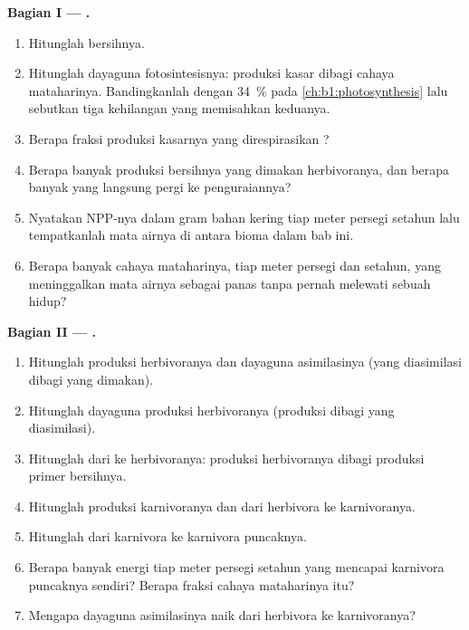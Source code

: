 \begin{problem}
\medskip
\noindent\textbf{Bagian I --- .}
\begin{enumerate}
  \item Hitunglah  bersihnya.
  \item Hitunglah dayaguna fotosintesisnya: produksi kasar dibagi
        cahaya mataharinya. Bandingkanlah dengan \qty{34}{\%} pada
        \cref{ch:b1:photosynthesis} lalu sebutkan tiga kehilangan yang
        memisahkan keduanya.
  \item Berapa fraksi produksi kasarnya yang direspirasikan
        ?
  \item Berapa banyak produksi bersihnya yang dimakan herbivoranya, dan
        berapa banyak yang langsung pergi ke penguraiannya?
  \item Nyatakan NPP-nya dalam gram bahan kering tiap meter persegi
        setahun lalu tempatkanlah mata airnya di antara bioma dalam bab
        ini.
  \item Berapa banyak cahaya mataharinya, tiap meter persegi dan
        setahun, yang meninggalkan mata airnya sebagai panas tanpa
        pernah melewati sebuah  hidup?
\end{enumerate}

\medskip
\noindent\textbf{Bagian II --- .}
\begin{enumerate}[resume]
  \item Hitunglah produksi herbivoranya dan dayaguna asimilasinya
        (yang diasimilasi dibagi yang dimakan).
  \item Hitunglah dayaguna produksi herbivoranya (produksi dibagi yang
        diasimilasi).
  \item Hitunglah  dari  ke herbivoranya:
        produksi herbivoranya dibagi produksi primer bersihnya.
  \item Hitunglah produksi karnivoranya dan  dari
        herbivora ke karnivoranya.
  \item Hitunglah  dari karnivora ke karnivora
        puncaknya.
  \item Berapa banyak energi tiap meter persegi setahun yang mencapai
         karnivora puncaknya sendiri? Berapa fraksi cahaya
        mataharinya itu?
  \item Mengapa dayaguna asimilasinya naik dari herbivora ke
        karnivoranya?
\end{enumerate}


\end{problem}

